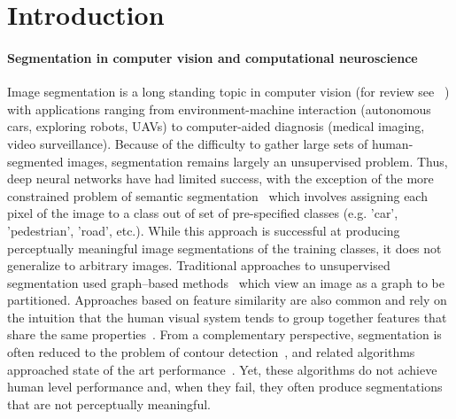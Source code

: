 \documentclass[a4paper,12pt]{article}
\begin{document}
\section{Introduction}
\label{sec:intro}

\paragraph{Segmentation in computer vision and computational neuroscience} Image segmentation is a long standing topic in computer vision (for review see \eg~\cite{pal1993review,morel2012variational,dey2010review}) with applications ranging from environment-machine interaction (\eg autonomous cars, exploring robots, UAVs) to computer-aided diagnosis (\eg medical imaging, video surveillance). Because of the difficulty to gather large sets of human-segmented images, segmentation remains largely an unsupervised problem. Thus, deep neural networks have had limited success, with the exception of the more constrained problem of semantic segmentation~\cite{badrinarayanan2017segnet,ronneberger2015u,chen2018deeplab,long2015fully} which involves assigning each pixel of the image to a class out of set of pre-specified classes (e.g. 'car', 'pedestrian', 'road', etc.). While this approach is successful at producing perceptually meaningful image segmentations of the training classes, it does not generalize to arbitrary images. Traditional approaches to unsupervised segmentation used graph--based methods~\cite{shi2000normalized,felzenszwalb2004efficient} which view an image as a graph to be partitioned. Approaches based on feature similarity are also common and rely on the intuition that the human visual system tends to group together features that share the same properties~\cite{alpert2012image,ning2010interactive,puzicha1997non}. From a complementary perspective, segmentation is often reduced to the problem of contour detection~\cite{MartinFTM01,arbelaez2011contour}, and related algorithms approached state of the art performance~\cite{maninis2016convolutional,zhao2015segmenting}. Yet, these algorithms do not achieve human level performance and, when they fail, they often produce segmentations that are not perceptually meaningful. 
\end{document}
